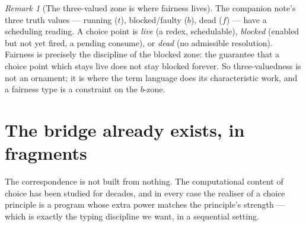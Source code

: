 \documentclass[11pt]{article}
\theoremstyle{definition}
\theoremstyle{plain}
\theoremstyle{remark}
\newtheorem{remark}{Remark}
\begin{document}
\begin{remark}[The three-valued zone is where fairness lives]
The companion note's three truth values --- running ($t$), blocked/faulty ($b$), dead ($f$)
\cite{consensus} --- have a scheduling reading. A choice point is \emph{live} (a redex, schedulable),
\emph{blocked} (enabled but not yet fired, a pending consume), or \emph{dead} (no admissible
resolution). Fairness is precisely the discipline of the blocked zone: the guarantee that a choice
point which stays live does not stay blocked forever. So three-valuedness is not an ornament; it is
where the term language does its characteristic work, and a fairness type is a constraint on the
$b$-zone.
\end{remark}

\section{The bridge already exists, in fragments}\label{sec:bridge}

The correspondence is not built from nothing. The computational content of choice has been studied
for decades, and in every case the realiser of a choice principle is a program whose extra power
matches the principle's strength --- which is exactly the typing discipline we want, in a sequential
setting.
\end{document}
